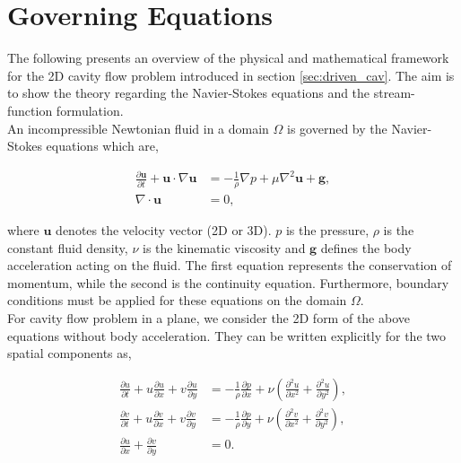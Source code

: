
\section{Governing Equations} \label{sec:gov_equ}

The following presents an overview of the physical and mathematical framework
for the 2D cavity flow problem introduced in section \ref{sec:driven_cav}. The
aim is to show the theory regarding the Navier-Stokes equations and the
stream-function formulation. \\

An incompressible Newtonian fluid in a domain $\Omega$ is governed by the
Navier-Stokes equations which are,

\begin{align}
\frac{\partial \mathbf{u}}{\partial t} + 
  \mathbf{u} \cdot \nabla \mathbf{u} &= 
  - \frac{1}{\rho} \nabla p + \mu \nabla^2 \mathbf{u} + \mathbf{g},
  \label{eq:ns3d} \\
\nabla \cdot \mathbf{u} &= 0 \label{eq:cont3d},
\end{align}

where $\mathbf{u}$ denotes the velocity vector (2D or 3D). $p$ is the pressure,
$\rho$ is the constant fluid density, $\nu$ is the kinematic viscosity and
$\mathbf{g}$ defines the body acceleration acting on the fluid. The first
equation represents the conservation of momentum, while the second is the
continuity equation. Furthermore, boundary conditions must be applied for these
equations on the domain $\Omega$. \\

For cavity flow problem in a plane, we consider the 2D form of the above
equations without body acceleration. They can be written explicitly for the two
spatial components as, 

\begin{align}
\frac{\partial u}{\partial t} + u \frac{\partial u}{\partial x} 
  + v \frac{\partial u}{\partial y} &= 
  - \frac{1}{\rho}\frac{\partial p}{\partial x}
  + \nu \left(\frac{\partial^2 u}{\partial x^2}
  + \frac{\partial^2 u}{\partial y^2}\right) \label{eq:ns2d-u}, \\
\frac{\partial v}{\partial t} + u \frac{\partial v}{\partial x}
  + v \frac{\partial v}{\partial y} &=
  - \frac{1}{\rho}\frac{\partial p}{\partial y} 
  + \nu \left(\frac{\partial^2 v}{\partial x^2}
  + \frac{\partial^2 v}{\partial y^2}\right) \label{eq:ns2d-v}, \\ 
\frac{\partial u}{\partial x}
  + \frac{\partial v}{\partial y} &= 0 \label{eq:cont2d}.
\end{align}

